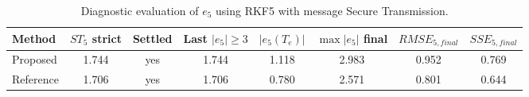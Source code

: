 \begin{table}[!t]
\centering
\caption{Diagnostic evaluation of $e_5$ using RKF5 with message Secure Transmission.}
\begin{tabular}{lccccccc}
\hline
Method & $ST_5$ strict & Settled & Last $|e_5|\ge 3$ & $|e_5(T_e)|$ & $\max|e_5|$ final & $RMSE_{5,final}$ & $SSE_{5,final}$ \\
\hline
Proposed & 1.744 & yes & 1.744 & 1.118 & 2.983 & 0.952 & 0.769 \\
Reference & 1.706 & yes & 1.706 & 0.780 & 2.571 & 0.801 & 0.644 \\
\hline
\end{tabular}
\end{table}
